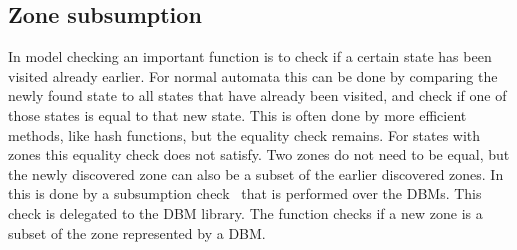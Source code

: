 \subsection{Zone subsumption}
\label{subsec:subsumtion}
In model checking an important function is to check if a certain state has been visited already earlier. For normal automata this can be done by comparing the newly found state to all states that have already been visited, and check if one of those states is equal to that new state. This is often done by more efficient methods, like hash functions, but the equality check remains. For states with zones this equality check does not satisfy. Two zones do not need to be equal, but the newly discovered zone can also be a subset of the earlier discovered zones. In \ltsmin{} this is done by a subsumption check~\cite{eemcs21972} that is performed over the DBMs. This check is delegated to the \uppaal{} DBM library. The function checks if a new zone is a subset of the zone represented by a DBM.